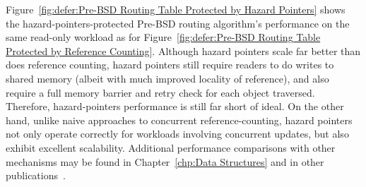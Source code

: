 Figure~\ref{fig:defer:Pre-BSD Routing Table Protected by Hazard Pointers}
shows the hazard-pointers-protected Pre-BSD routing algorithm's
performance on the same read-only workload as for
Figure~\ref{fig:defer:Pre-BSD Routing Table Protected by Reference Counting}.
Although hazard pointers scale far better than does reference counting,
hazard pointers still require readers to do writes to shared
memory (albeit with much improved locality of reference),
and also require a full memory barrier and retry check for each
object traversed.
Therefore, hazard-pointers performance is still far short of ideal.
On the other hand, unlike naive approaches to concurrent
reference-counting, hazard pointers not only operate correctly for
workloads involving concurrent updates, but also exhibit excellent
scalability.
Additional performance comparisons with other mechanisms may be found in
Chapter~\ref{chp:Data Structures}
and in other publications~\cite{ThomasEHart2007a,McKenney:2013:SDS:2483852.2483867,MagedMichael04a}.

\fi


